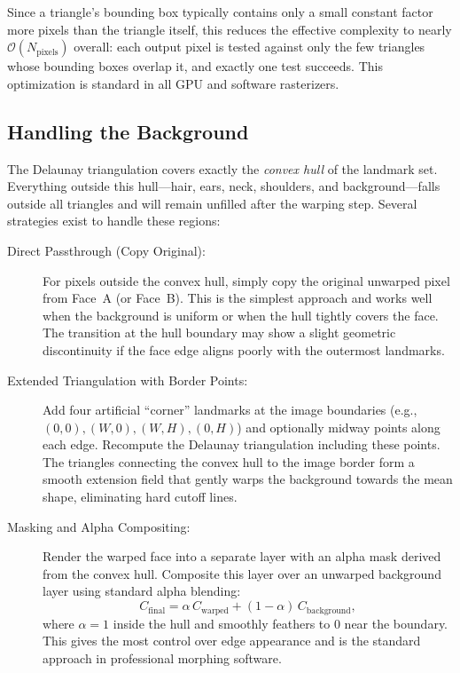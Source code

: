 Since a triangle's bounding box typically contains only a small constant factor more pixels than the triangle itself, this reduces the effective complexity to nearly $\mathcal{O}(N_{\text{pixels}})$ overall: each output pixel is tested against only the few triangles whose bounding boxes overlap it, and exactly one test succeeds. This optimization is standard in all GPU and software rasterizers.

\subsection{Handling the Background}

The Delaunay triangulation covers exactly the \emph{convex hull} of the landmark set. Everything outside this hull---hair, ears, neck, shoulders, and background---falls outside all triangles and will remain unfilled after the warping step. Several strategies exist to handle these regions:

\begin{description}
    \item[Direct Passthrough (Copy Original):] For pixels outside the convex hull, simply copy the original unwarped pixel from Face~A (or Face~B). This is the simplest approach and works well when the background is uniform or when the hull tightly covers the face. The transition at the hull boundary may show a slight geometric discontinuity if the face edge aligns poorly with the outermost landmarks.

    \item[Extended Triangulation with Border Points:] Add four artificial ``corner'' landmarks at the image boundaries (e.g., $(0,0), (W,0), (W,H), (0,H)$) and optionally midway points along each edge. Recompute the Delaunay triangulation including these points. The triangles connecting the convex hull to the image border form a smooth extension field that gently warps the background towards the mean shape, eliminating hard cutoff lines.

    \item[Masking and Alpha Compositing:] Render the warped face into a separate layer with an alpha mask derived from the convex hull. Composite this layer over an unwarped background layer using standard alpha blending:
    \[
        C_{\text{final}} = \alpha \, C_{\text{warped}} + (1 - \alpha) \, C_{\text{background}},
    \]
    where $\alpha = 1$ inside the hull and smoothly feathers to $0$ near the boundary. This gives the most control over edge appearance and is the standard approach in professional morphing software.
\end{description}

